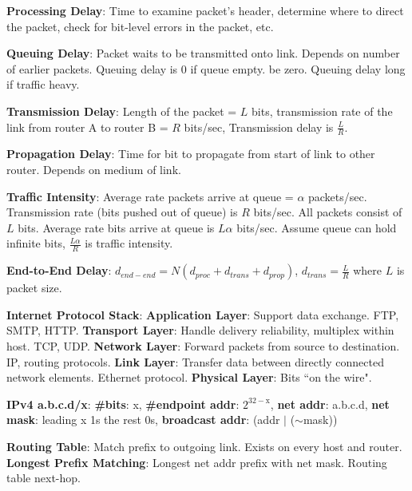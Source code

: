 \documentclass{scrartcl}
\begin{document}
\raggedright
\begin{multicols*}{3}


{\bf Processing Delay}: Time to examine packet's header, determine where to direct the packet, check for bit-level errors in the packet, etc.

{\bf Queuing Delay}: Packet waits to be transmitted onto link. Depends on number of earlier packets. Queuing delay is 0 if queue empty. be zero. Queuing delay long if traffic heavy.

{\bf Transmission Delay}: Length of the packet = $L$ bits, transmission rate of the link from router A to router B = $R$ bits/sec, Transmission delay is $\frac{L}{R}$.

{\bf Propagation Delay}: Time for bit to propagate from start of link to other router. Depends on medium of link.

{\bf Traffic Intensity}: Average rate packets arrive at queue = $\alpha$ packets/sec. Transmission rate (bits pushed out of queue) is $R$ bits/sec. All packets consist of $L$ bits. Average rate bits arrive at queue is $L\alpha$ bits/sec. Assume queue can hold infinite bits, $\frac{L\alpha}{R}$ is traffic intensity.

{\bf End-to-End Delay}: $d_{end-end} = N(d_{proc}+d_{trans}+d_{prop})$, $d_{trans}=\frac{L}{R}$ where $L$ is packet size.

{\bf Internet Protocol Stack}: {\bf Application Layer}: Support data exchange. FTP, SMTP, HTTP. {\bf Transport Layer}: Handle delivery reliability, multiplex within host. TCP, UDP. {\bf Network Layer}: Forward packets from source to destination. IP, routing protocols. {\bf Link Layer}: Transfer data between directly connected network elements. Ethernet protocol. {\bf Physical Layer}: Bits ``on the wire".

{\bf IPv4 a.b.c.d/x}: {\bf \#bits}: x, {\bf \#endpoint addr}: $2^{32-\text{x}}$, {\bf net addr}: a.b.c.d, {\bf net mask}: leading x 1s the rest 0s, {\bf broadcast addr}: (addr $|$ ($\sim$mask))

{\bf Routing Table}: Match prefix to outgoing link. Exists on every host and router. {\bf Longest Prefix Matching}: Longest net addr prefix with net mask. Routing table next-hop.


\end{multicols*}
\end{document}
